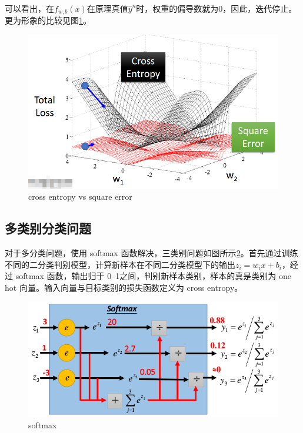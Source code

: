 可以看出，在$f_{w,b}(x)$在原理真值$\hat{y}^n$时，权重的偏导数就为0，因此，迭代停止。更为形象的比较见图\ref{fig:cross_entropy_vs_square_error}。
\begin{figure}[htb]
	\centering
	\includegraphics[scale=0.4]{pic/cross_entropy_vs_square_error}
	\caption{cross entropy vs square error}
	\label{fig:cross_entropy_vs_square_error}
\end{figure}

\subsection{多类别分类问题}
对于多分类问题，使用 softmax 函数解决，三类别问题如图所示\ref{fig:softmax}。首先通过训练不同的二分类判别模型，计算新样本在不同二分类模型下的输出$z_i=w_i x+b_i$，经过 softmax 函数，输出归于 0--1之间，判别新样本类别，样本的真是类别为 one hot 向量。输入向量与目标类别的损失函数定义为 cross entropy。

\begin{figure}
	\centering
	\includegraphics[scale=0.5]{pic/softmax}
	\caption{softmax}
	\label{fig:softmax}
\end{figure}


